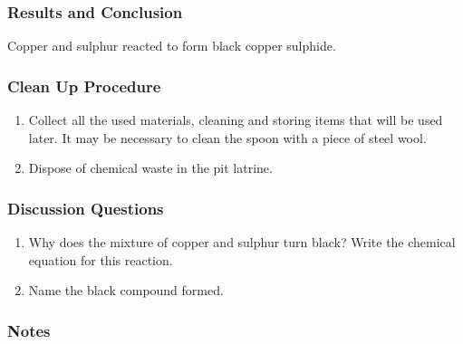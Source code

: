 \subsubsection*{Results and Conclusion}
Copper and sulphur reacted to form black copper sulphide.

\subsubsection*{Clean Up Procedure}
\begin{enumerate}
\item{Collect all the used materials, cleaning and storing items that will be used later. It may be necessary to clean the spoon with a piece of steel wool.}
\item{Dispose of chemical waste in the pit latrine.}
\end{enumerate}

\subsubsection*{Discussion Questions}
\begin{enumerate}
\item{Why does the mixture of copper and sulphur turn black? Write the chemical equation for this reaction.}
\item{Name the black compound formed.}
\end{enumerate}

\subsubsection*{Notes}
